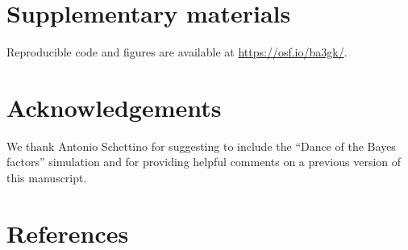 \documentclass[
  english,
  man, donotrepeattitle,floatsintext]{apa6}
\begin{document}
\hypertarget{supp}{%
\section{Supplementary materials}\label{supp}}

Reproducible code and figures are available at \url{https://osf.io/ba3gk/}.

\hypertarget{acknowledgements}{%
\section*{Acknowledgements}\label{acknowledgements}}

We thank Antonio Schettino for suggesting to include the ``Dance of the Bayes factors'' simulation and for providing helpful comments on a previous version of this manuscript.

\hypertarget{references}{%
\section*{References}\label{references}}
\end{document}
